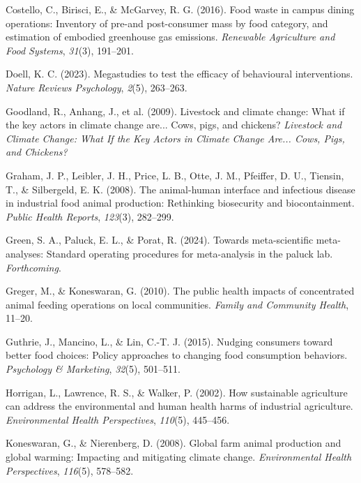 \documentclass[
  man]{apa6}
\newlength{\cslhangindent}
\newenvironment{CSLReferences}[2] %
 {\begin{list}{}{%
  \setlength{\itemindent}{0pt}
  \setlength{\leftmargin}{0pt}
  \setlength{\parsep}{0pt}
  \ifodd #1
   \setlength{\leftmargin}{\cslhangindent}
   \setlength{\itemindent}{-1\cslhangindent}
  \fi
  \setlength{\itemsep}{#2\baselineskip}}}
 {\end{list}}
\begin{document}
\begin{CSLReferences}{1}{0}
Costello, C., Birisci, E., \& McGarvey, R. G. (2016). Food waste in campus dining operations: Inventory of pre-and post-consumer mass by food category, and estimation of embodied greenhouse gas emissions. \emph{Renewable Agriculture and Food Systems}, \emph{31}(3), 191--201.

Doell, K. C. (2023). Megastudies to test the efficacy of behavioural interventions. \emph{Nature Reviews Psychology}, \emph{2}(5), 263--263.

Goodland, R., Anhang, J., et al. (2009). Livestock and climate change: What if the key actors in climate change are... Cows, pigs, and chickens? \emph{Livestock and Climate Change: What If the Key Actors in Climate Change Are... Cows, Pigs, and Chickens?}

Graham, J. P., Leibler, J. H., Price, L. B., Otte, J. M., Pfeiffer, D. U., Tiensin, T., \& Silbergeld, E. K. (2008). The animal-human interface and infectious disease in industrial food animal production: Rethinking biosecurity and biocontainment. \emph{Public Health Reports}, \emph{123}(3), 282--299.

Green, S. A., Paluck, E. L., \& Porat, R. (2024). Towards meta-scientific meta-analyses: Standard operating procedures for meta-analysis in the paluck lab. \emph{Forthcoming}.

Greger, M., \& Koneswaran, G. (2010). The public health impacts of concentrated animal feeding operations on local communities. \emph{Family and Community Health}, 11--20.

Guthrie, J., Mancino, L., \& Lin, C.-T. J. (2015). Nudging consumers toward better food choices: Policy approaches to changing food consumption behaviors. \emph{Psychology \& Marketing}, \emph{32}(5), 501--511.

Horrigan, L., Lawrence, R. S., \& Walker, P. (2002). How sustainable agriculture can address the environmental and human health harms of industrial agriculture. \emph{Environmental Health Perspectives}, \emph{110}(5), 445--456.

Koneswaran, G., \& Nierenberg, D. (2008). Global farm animal production and global warming: Impacting and mitigating climate change. \emph{Environmental Health Perspectives}, \emph{116}(5), 578--582.


\end{CSLReferences}
\end{document}
